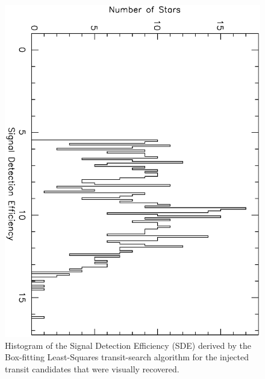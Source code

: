 \begin{figure}
\begin{center}
\centering
\includegraphics[width=.75\textwidth, angle=90]{7_visual_f}
\caption[Histogram of SDEs for visually recovered transit candidates]{%
Histogram of the Signal Detection Efficiency (SDE) derived by the Box-fitting Least-Squares transit-search algorithm for the injected transit candidates that were visually recovered.%
}\label{cha:human:sec:model:fig:vishistsderec}
\end{center}
\end{figure}

